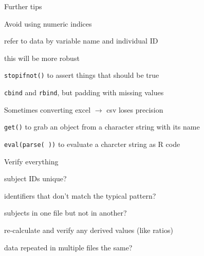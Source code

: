 \documentclass[aspectratio=169,12pt,t]{beamer}
\begin{document}
\begin{frame}{Further tips}

\bbi
\item Avoid using numeric indices
  \bi
\item refer to data by variable name and individual ID
\item this will be more {\hilit robust}
  \ei
\item {\tt stopifnot()} to assert things that should be true
\item {\tt cbind} and {\tt rbind}, but padding with missing values
\item Sometimes converting excel $\rightarrow$ csv loses precision
\item {\tt get()} to grab an object from a character string with its
  name
\item {\tt eval(parse( ))} to evaluate a charcter string as R code
  \ei

\end{frame}




\begin{frame}{Verify everything}

\bbi
\item subject IDs unique?
\item identifiers that don't match the typical pattern?
\item subjects in one file but not in another?
\item re-calculate and verify any derived values (like ratios)
\item data repeated in multiple files the same?
\ei

\end{frame}
\end{document}
